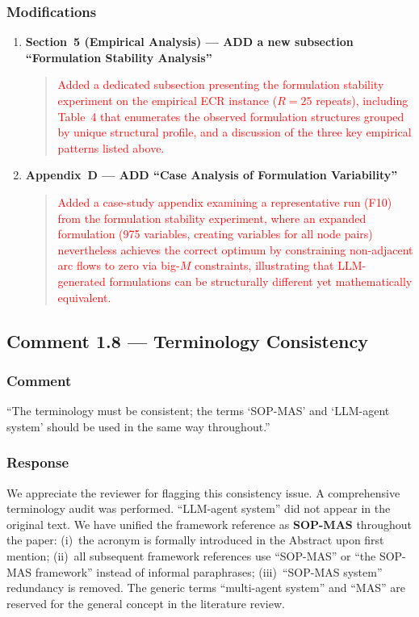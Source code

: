 \documentclass[11pt,a4paper]{article}
\begin{document}
\subsubsection{Modifications}
\begin{enumerate}
\item \textbf{Section~5 (Empirical Analysis) --- ADD a new subsection ``Formulation Stability Analysis''}
\begin{quote}
\textcolor{red}{
Added a dedicated subsection presenting the formulation stability experiment on the empirical ECR instance ($R{=}25$ repeats), including Table~4 that enumerates the observed formulation structures grouped by unique structural profile, and a discussion of the three key empirical patterns listed above.
}
\end{quote}

\item \textbf{Appendix~D --- ADD ``Case Analysis of Formulation Variability''}
\begin{quote}
\textcolor{red}{
Added a case-study appendix examining a representative run (F10) from the formulation stability experiment, where an expanded formulation (975 variables, creating variables for all node pairs) nevertheless achieves the correct optimum by constraining non-adjacent arc flows to zero via big-$M$ constraints, illustrating that LLM-generated formulations can be structurally different yet mathematically equivalent.
}
\end{quote}
\end{enumerate}
\subsection{Comment 1.8 --- Terminology Consistency}

\subsubsection{Comment}
``The terminology must be consistent; the terms `SOP-MAS' and `LLM-agent system' should be used in the same way throughout.''

\subsubsection{Response}
We appreciate the reviewer for flagging this consistency issue. A comprehensive terminology audit was performed. ``LLM-agent system'' did not appear in the original text. We have unified the framework reference as \textbf{SOP-MAS} throughout the paper: (i)~the acronym is formally introduced in the Abstract upon first mention; (ii)~all subsequent framework references use ``SOP-MAS'' or ``the SOP-MAS framework'' instead of informal paraphrases; (iii)~``SOP-MAS system'' redundancy is removed. The generic terms ``multi-agent system'' and ``MAS'' are reserved for the general concept in the literature review.
\end{document}

